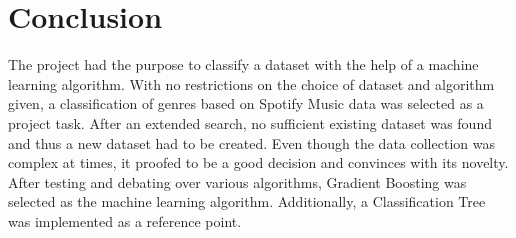 \section{Conclusion}

The project had the purpose to classify a dataset with the help of a machine learning algorithm. With no restrictions on the choice of dataset and algorithm given, 
a classification of genres based on Spotify Music data was selected as a project task. After an extended search, 
no sufficient existing dataset was found and thus a new dataset had to be created. Even though the data collection was complex at times, 
it proofed to be a good decision and convinces with its novelty. After testing and debating over various algorithms, Gradient Boosting was
selected as the machine learning algorithm. Additionally, a Classification Tree was implemented as a reference point.


